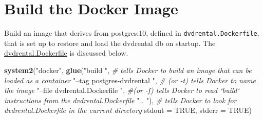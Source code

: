 \documentclass[]{book}
\newenvironment{Shaded}{\begin{snugshade}}{\end{snugshade}}
\newcommand{\CommentTok}[1]{\textcolor[rgb]{0.56,0.35,0.01}{\textit{#1}}}
\newcommand{\DataTypeTok}[1]{\textcolor[rgb]{0.13,0.29,0.53}{#1}}
\newcommand{\KeywordTok}[1]{\textcolor[rgb]{0.13,0.29,0.53}{\textbf{#1}}}
\newcommand{\NormalTok}[1]{#1}
\newcommand{\OtherTok}[1]{\textcolor[rgb]{0.56,0.35,0.01}{#1}}
\newcommand{\StringTok}[1]{\textcolor[rgb]{0.31,0.60,0.02}{#1}}
\theoremstyle{definition}
\theoremstyle{definition}
\theoremstyle{definition}
\theoremstyle{remark}
\begin{document}
\hypertarget{build-the-docker-image}{%
\section{Build the Docker Image}\label{build-the-docker-image}}

Build an image that derives from postgres:10, defined in
\texttt{dvdrental.Dockerfile}, that is set up to restore and load the
dvdrental db on startup. The
\href{./dvdrental.Dockerfile}{dvdrental.Dockerfile} is discussed below.

\begin{Shaded}
\begin{Highlighting}[]
\KeywordTok{system2}\NormalTok{(}\StringTok{"docker"}\NormalTok{, }
        \KeywordTok{glue}\NormalTok{(}\StringTok{"build "}\NormalTok{, }\CommentTok{# tells Docker to build an image that can be loaded as a container}
          \StringTok{"--tag postgres-dvdrental "}\NormalTok{, }\CommentTok{# (or -t) tells Docker to name the image}
          \StringTok{"--file dvdrental.Dockerfile "}\NormalTok{, }\CommentTok{#(or -f) tells Docker to read `build` instructions from the dvdrental.Dockerfile}
          \StringTok{" . "}\NormalTok{),  }\CommentTok{# tells Docker to look for dvdrental.Dockerfile in the current directory}
          \DataTypeTok{stdout =} \OtherTok{TRUE}\NormalTok{, }\DataTypeTok{stderr =} \OtherTok{TRUE}\NormalTok{)}
\end{Highlighting}
\end{Shaded}
\end{document}
